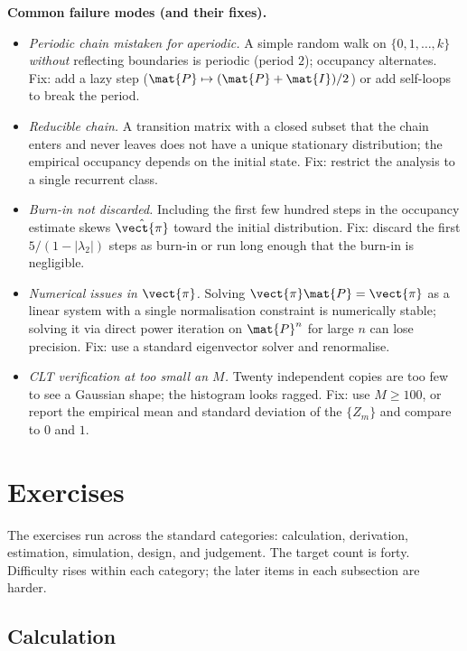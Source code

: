 \begin{project}
\textbf{Common failure modes (and their fixes).}

\begin{itemize}[leftmargin=*]
  \item \emph{Periodic chain mistaken for aperiodic.} A simple
    random walk on $\{0, 1, \ldots, k\}$ \emph{without} reflecting
    boundaries is periodic (period $2$); occupancy alternates.
    Fix: add a lazy step ($\mat{P} \mapsto (\mat{P} + \mat{I})/2$)
    or add self-loops to break the period.
  \item \emph{Reducible chain.} A transition matrix with a closed
    subset that the chain enters and never leaves does not have a
    unique stationary distribution; the empirical occupancy depends
    on the initial state. Fix: restrict the analysis to a single
    recurrent class.
  \item \emph{Burn-in not discarded.} Including the first few
    hundred steps in the occupancy estimate skews $\hat{\vect{\pi}}$
    toward the initial distribution. Fix: discard the first
    $5/(1 - |\lambda_{2}|)$ steps as burn-in or run long enough that
    the burn-in is negligible.
  \item \emph{Numerical issues in $\vect{\pi}$.} Solving
    $\vect{\pi}\mat{P} = \vect{\pi}$ as a linear system with a
    single normalisation constraint is numerically stable; solving
    it via direct power iteration on $\mat{P}^{n}$ for large $n$
    can lose precision. Fix: use a standard eigenvector solver and
    renormalise.
  \item \emph{CLT verification at too small an $M$.} Twenty
    independent copies are too few to see a Gaussian shape; the
    histogram looks ragged. Fix: use $M \geq 100$, or report the
    empirical mean and standard deviation of the $\{Z_{m}\}$ and
    compare to $0$ and $1$.
\end{itemize}
\end{project}

\section{Exercises}

The exercises run across the standard categories: calculation,
derivation, estimation, simulation, design, and judgement. The
target count is forty. Difficulty rises within each category; the
later items in each subsection are harder.

\subsection*{Calculation}

